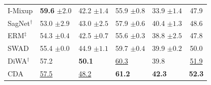 \documentclass[10pt]{article}
\begin{document}
\begin{table}[H]
\begin{tabular}{lllll|c}
I-Mixup & \textbf{59.6} \scriptsize$\pm2.0$ & 42.2 \scriptsize$\pm1.4$ & 55.9 \scriptsize$\pm0.8$ & 33.9 \scriptsize$\pm1.4$ & 47.9 \\
SagNet$^\dagger$ & 53.0 \scriptsize$\pm2.9$ & 43.0 \scriptsize$\pm2.5$ & 57.9 \scriptsize$\pm0.6$ & 40.4 \scriptsize$\pm1.3$ & 48.6 \\
ERM$^\ddagger$ & 54.3 \scriptsize$\pm0.4$ & 42.5 \scriptsize$\pm0.7$ & 55.6 \scriptsize$\pm0.3$ & 38.8 \scriptsize$\pm2.5$ & 47.8 \\
SWAD & 55.4 \scriptsize$\pm0.0$ & 44.9 \scriptsize$\pm1.1$ & 59.7 \scriptsize$\pm0.4$ & 39.9 \scriptsize$\pm0.2$ & 50.0 \\
DiWA$^\dagger$ & 57.2 & \textbf{50.1} & \underline{60.3} & 39.8 & \underline{51.9} \\
\midrule
CDA & \underline{57.5} & \underline{48.2} & \textbf{61.2} & \textbf{42.3} & \textbf{52.3} \\
\bottomrule
\end{tabular}
\end{table}
\end{document}
